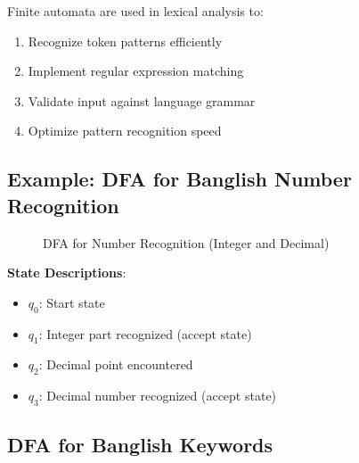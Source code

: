 \documentclass[12pt,a4paper]{article}
\begin{document}
Finite automata are used in lexical analysis to:
\begin{enumerate}[itemsep=2pt]
    \item Recognize token patterns efficiently
    \item Implement regular expression matching
    \item Validate input against language grammar
    \item Optimize pattern recognition speed
\end{enumerate}

\subsection{Example: DFA for Banglish Number Recognition}

\begin{figure}[H]
    \centering
    \caption{DFA for Number Recognition (Integer and Decimal)}
\end{figure}

\textbf{State Descriptions}:
\begin{itemize}
    \item \textbf{$q_0$}: Start state
    \item \textbf{$q_1$}: Integer part recognized (accept state)
    \item \textbf{$q_2$}: Decimal point encountered
    \item \textbf{$q_3$}: Decimal number recognized (accept state)
\end{itemize}

\subsection{DFA for Banglish Keywords}
\end{document}
